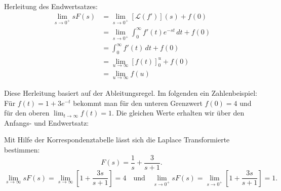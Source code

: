 Herleitung des Endwertsatzes:
\begin{align*}
    \lim_{s \to 0^+} sF(s)
    &= \lim_{s \to 0^+} [\mathcal{L}(f')](s) + f(0) \\
    &= \lim_{s \to 0^+} \int_0^{\infty} f'(t) e^{-st} \, dt + f(0) \\
    &= \int_0^{\infty} f'(t) \, dt + f(0) \\
    &= \lim_{u \to \infty} [f(t)]_0^u + f(0) \\
    &= \lim_{u \to \infty} f(u)
    \end{align*}
    \cite[S. 891]{buch1}

Diese Herleitung basiert auf der Ableitungsregel.
Im folgenden ein Zahlenbeispiel:
Für \( f(t) = 1 + 3e^{-t} \) bekommt man für den unteren Grenzwert \( f(0) = 4 \) und für den oberen \( \lim_{t \to \infty} f(t) = 1 \). 
Die gleichen Werte erhalten wir über den Anfangs- und Endwertsatz:

Mit Hilfe der Korrespondenztabelle lässt sich die Laplace Transformierte bestimmen:
\[
F(s) = \frac{1}{s} + \frac{3}{s + 1}.
\]
\[
\lim_{s \to \infty} sF(s) = \lim_{s \to \infty} \left[ 1 + \frac{3s}{s + 1} \right] = 4 
\quad \text{und} \quad 
\lim_{s \to 0^+} sF(s) = \lim_{s \to 0^+} \left[ 1 + \frac{3s}{s + 1} \right] = 1.
\] \cite[S. 894]{buch1}









    

    

